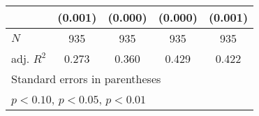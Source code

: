 {\begin{tabular}{l*{4}{c}}
            &     (0.001)         &     (0.000)         &     (0.000)         &     (0.001)         \\
\hline
\(N\)       &         935         &         935         &         935         &         935         \\
adj. \(R^{2}\)&       0.273         &       0.360         &       0.429         &       0.422         \\
\hline\hline
\multicolumn{5}{l}{\footnotesize Standard errors in parentheses}\\
\multicolumn{5}{l}{\footnotesize \sym{*} \(p<0.10\), \sym{**} \(p<0.05\), \sym{***} \(p<0.01\)}\\
\end{tabular}
}
